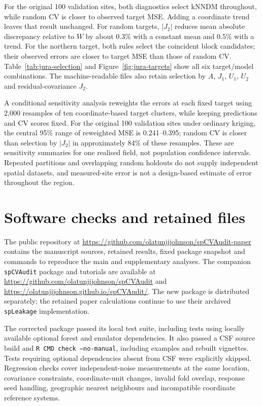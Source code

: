 \documentclass[11pt,a4paper]{article}
\begin{document}
For the original 100 validation sites, both diagnostics select kNNDM throughout, while random CV is closer to observed target MSE. Adding a coordinate trend leaves that result unchanged. For random targets, $|J_2|$ reduces mean absolute discrepancy relative to $W$ by about 0.3\% with a constant mean and 0.5\% with a trend. For the northern target, both rules select the coincident block candidates; their observed errors are closer to target MSE than those of random CV. Table~\ref{tab:jura-selection} and Figure~\ref{fig:jura-targets} show all six target/model combinations. The machine-readable files also retain selection by $A$, $J_1$, $U_1$, $U_2$ and residual-covariance $J_2$.

A conditional sensitivity analysis reweights the errors at each fixed target using 2,000 resamples of ten coordinate-based target clusters, while keeping predictions and CV scores fixed. For the original 100 validation sites under ordinary kriging, the central 95\% range of reweighted MSE is 0.241--0.395; random CV is closer than selection by $|J_2|$ in approximately 84\% of these resamples. These are sensitivity summaries for one realised field, not population confidence intervals. Repeated partitions and overlapping random holdouts do not supply independent spatial datasets, and measured-site error is not a design-based estimate of error throughout the region.

\section{Software checks and retained files}
\label{sec:reproduction}
The public repository at \url{https://github.com/olatunjijohnson/spCVAudit-paper} contains the manuscript sources, retained results, fixed package snapshot and commands to reproduce the main and supplementary analyses. The companion \texttt{spCVAudit} package and tutorials are available at \url{https://github.com/olatunjijohnson/spCVAudit} and \url{https://olatunjijohnson.github.io/spCVAudit/}. The new package is distributed separately; the retained paper calculations continue to use their archived \texttt{spLeakage} implementation.

The corrected package passed its local test suite, including tests using locally available optional forest and emulator dependencies. It also passed a CSF source build and \texttt{R CMD check --no-manual}, including examples and rebuilt vignettes. Tests requiring optional dependencies absent from CSF were explicitly skipped. Regression checks cover independent-noise measurements at the same location, covariance constraints, coordinate-unit changes, invalid fold overlap, response seed handling, geographic nearest neighbours and incompatible coordinate reference systems.
\end{document}
